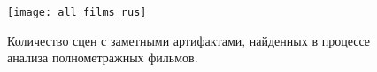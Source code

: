 \begin{figure}[!h]
	\begin{minipage}[b]{1.0\linewidth}
		\centering
		\centerline{ \texttt{[image: all\_films\_rus]} }
	\end{minipage}
    \caption{Количество сцен с заметными артифактами, найденных 
    	в процессе анализа полнометражных фильмов.}
	\label{fig:results}
\end{figure}
